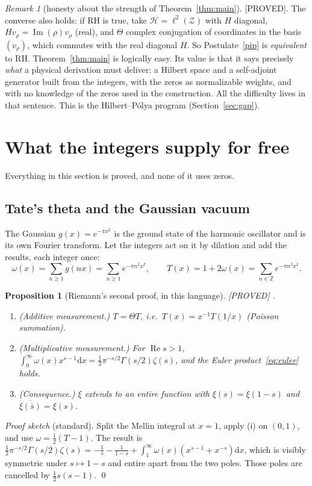 \documentclass[11pt,a4paper]{article}
\theoremstyle{plain}
\newtheorem{proposition}[theorem]{Proposition}
\theoremstyle{definition}
\theoremstyle{remark}
\newtheorem{remark}[theorem]{Remark}
\newcommand{\Z}{\mathbb{Z}}
\newcommand{\cH}{\mathcal{H}}
\newcommand{\dd}{\mathrm{d}}
\newcommand{\lab}[1]{\textsf{\small[#1]}}
\newcommand{\PROVED}{\lab{PROVED}}
\renewcommand{\Re}{\operatorname{Re}}
\renewcommand{\Im}{\operatorname{Im}}
\begin{document}
\begin{remark}[honesty about the strength of Theorem~\ref{thm:main}]\label{rem:tauto}
\PROVED. The converse also holds: if RH is true, take
$\cH=\ell^2(\mathcal Z)$ with $H$ diagonal, $Hv_\rho=\Im(\rho)v_\rho$ (real),
and $\Theta$ complex conjugation of coordinates in the basis $(v_\rho)$, which commutes with the real diagonal $H$.
So Postulate~\ref{pip} is \emph{equivalent} to RH. Theorem~\ref{thm:main} is
logically easy. Its value is that it says precisely \emph{what} a physical
derivation must deliver: a Hilbert space and a self-adjoint generator built
from the integers, with the zeros as normalizable weights, and with no
knowledge of the zeros used in the construction. All the difficulty lives
in that sentence. This is the Hilbert--P\'olya program
(Section~\ref{sec:gap}).
\end{remark}

\section{What the integers supply for free}
\label{sec:free}

Everything in this section is proved, and none of it uses zeros.

\subsection{Tate's theta and the Gaussian vacuum}

The Gaussian $g(x)=e^{-\pi x^2}$ is the ground state of the harmonic
oscillator and is its own Fourier transform. Let the integers act on it by
dilation and add the results, each integer once:
\[
\omega(x)=\sum_{n\ge1}g(nx)=\sum_{n\ge1}e^{-\pi n^2x^2},\qquad
T(x)=1+2\omega(x)=\sum_{n\in\Z}e^{-\pi n^2x^2}.
\]
\begin{proposition}[Riemann's second proof, in this language]\label{prop:fe}
\PROVED{} \cite{Riemann1859,Titchmarsh1986,Tate1950}.
\begin{enumerate}[label=(\roman*)]
\item (Additive measurement.) $T=\Theta T$, i.e.\ $T(x)=x^{-1}T(1/x)$
(Poisson summation).
\item (Multiplicative measurement.) For $\Re s>1$,
$\displaystyle\int_0^\infty\omega(x)x^{s-1}\dd x=\tfrac12\pi^{-s/2}\Gamma(s/2)\zeta(s)$,
and the Euler product~\eqref{eq:euler} holds.
\item (Consequence.) $\xi$ extends to an entire function with
$\xi(s)=\xi(1-s)$ and $\overline{\xi(\bar s)}=\xi(s)$.
\end{enumerate}
\end{proposition}
\noindent
\emph{Proof sketch} (standard). Split the Mellin integral at $x=1$, apply (i)
on $(0,1)$, and use $\omega=\tfrac12(T-1)$. The result is
$\tfrac12\pi^{-s/2}\Gamma(s/2)\zeta(s)=-\frac1s-\frac1{1-s}
+\int_1^\infty\omega(x)(x^{s-1}+x^{-s})\dd x$, which is visibly symmetric
under $s\mapsto1-s$ and entire apart from the two poles. Those poles are
cancelled by $\tfrac12s(s-1)$. \qed
\end{document}
